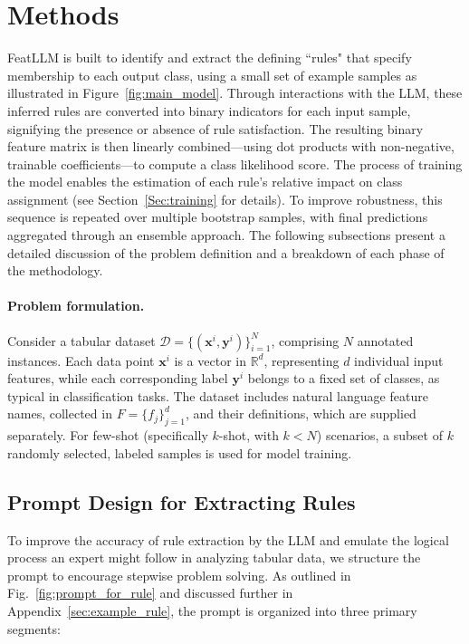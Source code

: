 \section{Methods}
\textsf{FeatLLM} is built to identify and extract the defining ``rules" that specify membership to each output class, using a small set of example samples as illustrated in Figure~\ref{fig:main_model}. Through interactions with the LLM, these inferred rules are converted into binary indicators for each input sample, signifying the presence or absence of rule satisfaction. The resulting binary feature matrix is then linearly combined—using dot products with non-negative, trainable coefficients—to compute a class likelihood score. The process of training the model enables the estimation of each rule’s relative impact on class assignment (see Section~\ref{Sec:training} for details). To improve robustness, this sequence is repeated over multiple bootstrap samples, with final predictions aggregated through an ensemble approach. The following subsections present a detailed discussion of the problem definition and a breakdown of each phase of the methodology.

\vspace*{-0.12in}
\paragraph{Problem formulation.} Consider a tabular dataset $\mathcal{D} = \{(\mathbf{x}^i, \mathbf{y}^i)\}_{i=1}^{N}$, comprising $N$ annotated instances. Each data point $\mathbf{x}^i$ is a vector in $\mathbb{R}^d$, representing $d$ individual input features, while each corresponding label $\mathbf{y}^i$ belongs to a fixed set of classes, as typical in classification tasks. The dataset includes natural language feature names, collected in $F = \{f_j\}_{j=1}^{d}$, and their definitions, which are supplied separately. For few-shot (specifically $k$-shot, with $k < N$) scenarios, a subset of $k$ randomly selected, labeled samples is used for model training.

\subsection{Prompt Design for Extracting Rules}
\label{Sec:prompt_design}
To improve the accuracy of rule extraction by the LLM and emulate the logical process an expert might follow in analyzing tabular data, we structure the prompt to encourage stepwise problem solving. As outlined in Fig.~\ref{fig:prompt_for_rule} and discussed further in Appendix~\ref{sec:example_rule}, the prompt is organized into three primary segments:

